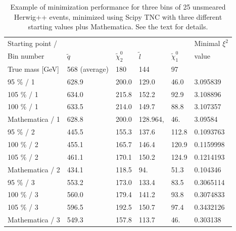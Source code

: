 \documentclass[twoside,english]{uiofysmaster}
\begin{document}
\begin{table}[hbt]
	\centering
	\begin{tabular}{| l | l | l | l | l | l |}
		\hline
		Starting point / &&&&																					&  Minimal $\xi^2$ \\ 
		Bin number 						& $\tilde q$	& $\tilde \chi_2^0$	& $\tilde l$	& $\tilde \chi_1^0$ & value \\ \hline
		True mass [GeV]					& 568 (average) & 180 				& 144 			& 97 				& \\ \hline
		95 \%  / 1 						& 628.9   		& 200.0   			& 129.0   		& 46.0     			& 3.095839 \\ \hline
		105 \% / 1 						& 634.0   		& 215.8   			& 152.2   		& 92.9     			& 3.108896 \\ \hline
		100 \% / 1 						& 633.5   		& 214.0   			& 149.7   		& 88.8     			& 3.107357 \\ \hline
		Mathematica / 1 			    & 628.8 		& 200.0				& 128.964,		& 46.				& 3.09584		\\ \hline
		95 \%  / 2 						& 445.5   		& 155.3   			& 137.6   		& 112.8    			& 0.1093763 \\ \hline
		100 \% / 2 						& 455.1   		& 165.7   			& 146.4   		& 120.9    			& 0.1159998 \\ \hline
		105 \% / 2 						& 461.1   		& 170.1   			& 150.2   		& 124.9    			& 0.1214193 \\ \hline
		Mathematica / 2 				& 434.1 		& 118.5 			& 94. 			& 51.3 				& 0.104346	\\ \hline
		95 \%  / 3 						& 553.2   		& 173.0   			& 133.4   		& 83.5     			& 0.3065114 \\ \hline
		100 \% / 3 						& 560.0   		& 179.4   			& 141.2   		& 93.8     			& 0.3074833 \\ \hline
		105 \% / 3 				 		& 596.5   		& 192.5   			& 150.7   		& 97.4     			& 0.3432126 \\ \hline
		Mathematica / 3 				& 549.3 		& 157.8 			& 113.7 		& 46. 				& 0.303138 \\ \hline	
	\end{tabular}
	\caption{Example of minimization performance for three bins of 25 unsmeared {\ttfamily Herwig++} events, minimized using Scipy TNC with three different starting values plus Mathematica. See the text for details.}
	\label{table:starting_point_fit_dependency}
\end{table}
\end{document}
